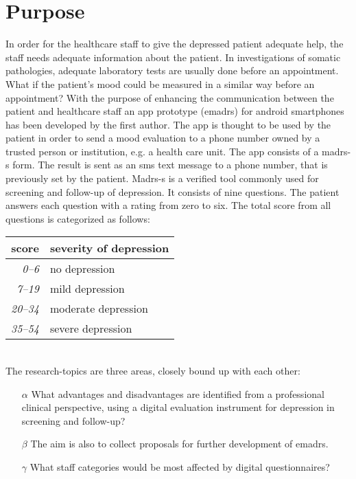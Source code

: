 \documentclass[12pt,a4paper,oneside]{article}
\let\oldcite\cite
\renewcommand*\cite[1]{\textsuperscript{\oldcite{#1}}}
\begin{document}
\section*{Purpose}
In order for the healthcare staff to give the depressed patient adequate help, the staff needs adequate information about the patient. In investigations of somatic pathologies, adequate laboratory tests are usually done before an appointment. What if the patient's mood could be measured in a similar way before an appointment? With the purpose of enhancing the communication between the patient and healthcare staff an app prototype (e{\sc madrs}) for android smartphones has been developed by the first author\cite{emadrs1, emadrs2}. The app is thought to be used by the patient in order to send a mood evaluation to a phone number owned by a trusted person or institution, e.g. a health care unit. The app consists of a {\sc madrs-s} form. The result is sent as an {\sc sms} text message to a phone number, that is previously set by the patient. {\sc Madrs-s} is a verified tool commonly used for screening and follow-up of depression\cite{madrs2,madrs3}. It consists of nine questions. The patient answers each question with a rating from zero to six. The total score from all questions is categorized as follows:\\

\begin{tabular}{r|l}
{\bf score} & {\bf severity of depression}\\
\hline{\it 0--6} &  no depression\\
{\it 7--19} & mild depression\\
{\it 20--34} & moderate depression\\
{\it 35--54} & severe depression\\
\end{tabular}\vspace{1em}
\\The research-topics are three areas, closely bound up with each other:
\begin{itemize}
\item[$\alpha$] What advantages and disadvantages are identified from a professional clinical perspective, using a digital evaluation instrument for depression in screening and follow-up?
\item[$\beta$] The aim is also to collect proposals for further development of e{\sc madrs}.
\item[$\gamma$] What staff categories would be most affected by digital questionnaires?
\end{itemize}
\end{document}
